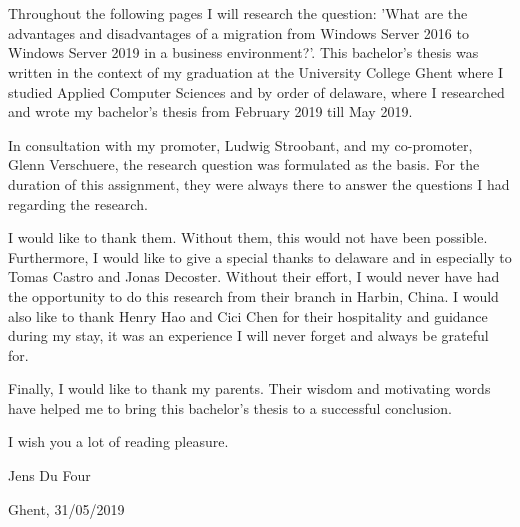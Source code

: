 
\chapter*{}
\label{ch:voorwoord}

Throughout the following pages I will research the question: 'What are the advantages and disadvantages of a migration from Windows Server 2016 to Windows Server 2019 in a business environment?'. 
This bachelor's thesis was written in the context of my graduation at the University College Ghent where I studied Applied Computer Sciences and by order of delaware, where I researched and wrote my bachelor's thesis from February 2019 till May 2019.

In consultation with my promoter, Ludwig Stroobant, and my co-promoter, Glenn Verschuere, the research question was formulated as the basis. 
For the duration of this assignment, they were always there to answer the questions I had regarding the research. 

I would like to thank them. 
Without them, this would not have been possible.
Furthermore, I would like to give a special thanks to delaware and in especially to Tomas Castro and Jonas Decoster. 
Without their effort, I would never have had the opportunity to do this research from their branch in Harbin, China.
I would also like to thank Henry Hao and Cici Chen for their hospitality and guidance during my stay, it was an experience I will never forget and always be grateful for. 

Finally, I would like to thank my parents. Their wisdom and motivating words have helped me to bring this bachelor's thesis to a successful conclusion.

I wish you a lot of reading pleasure.

Jens Du Four

Ghent, 31/05/2019